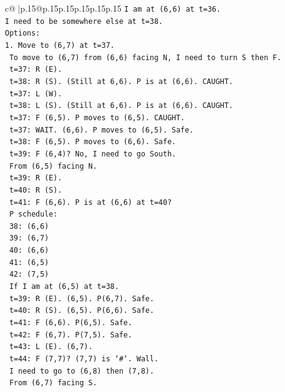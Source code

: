 \documentclass{article}
\begin{document}
{\begin{supertabular}{c@{$\;$}|p{.15\linewidth}@{}p{.15\linewidth}p{.15\linewidth}p{.15\linewidth}p{.15\linewidth}p{.15\linewidth}}
{{{\texttt{I am at (6,6) at t=36.} \\
\texttt{I need to be somewhere else at t=38.} \\
\texttt{Options:} \\
\texttt{1. Move to (6,7) at t=37.} \\
\texttt{   To move to (6,7) from (6,6) facing N, I need to turn S then F.} \\
\texttt{   t=37: R (E).} \\
\texttt{   t=38: R (S). (Still at 6,6). P is at (6,6). CAUGHT.} \\
\texttt{   t=37: L (W).} \\
\texttt{   t=38: L (S). (Still at 6,6). P is at (6,6). CAUGHT.} \\
\texttt{   t=37: F (6,5). P moves to (6,5). CAUGHT.} \\
\texttt{   t=37: WAIT. (6,6). P moves to (6,5). Safe.} \\
\texttt{   t=38: F (6,5). P moves to (6,6). Safe.} \\
\texttt{   t=39: F (6,4)? No, I need to go South.} \\
\texttt{   From (6,5) facing N.} \\
\texttt{   t=39: R (E).} \\
\texttt{   t=40: R (S).} \\
\texttt{   t=41: F (6,6). P is at (6,6) at t=40?} \\
\texttt{   P schedule:} \\
\texttt{   38: (6,6)} \\
\texttt{   39: (6,7)} \\
\texttt{   40: (6,6)} \\
\texttt{   41: (6,5)} \\
\texttt{   42: (7,5)} \\
\texttt{   If I am at (6,5) at t=38.} \\
\texttt{   t=39: R (E). (6,5). P(6,7). Safe.} \\
\texttt{   t=40: R (S). (6,5). P(6,6). Safe.} \\
\texttt{   t=41: F (6,6). P(6,5). Safe.} \\
\texttt{   t=42: F (6,7). P(7,5). Safe.} \\
\texttt{   t=43: L (E). (6,7).} \\
\texttt{   t=44: F (7,7)? (7,7) is `\#`. Wall.} \\
\texttt{   I need to go to (6,8) then (7,8).} \\
\texttt{   From (6,7) facing S.} \\
}}}
\end{supertabular}}
\end{document}
